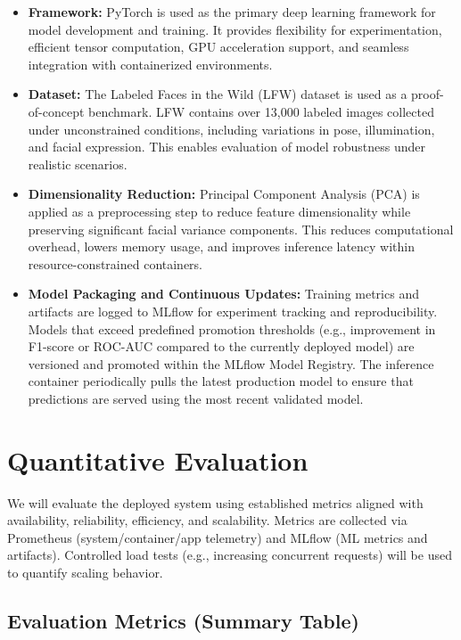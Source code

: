\documentclass[10pt]{article}
\begin{document}
\begin{itemize}[leftmargin=*]

\item \textbf{Framework:}
PyTorch is used as the primary deep learning framework for model development and training. It provides flexibility for experimentation, efficient tensor computation, GPU acceleration support, and seamless integration with containerized environments.

\item \textbf{Dataset:}
The Labeled Faces in the Wild (LFW) dataset is used as a proof-of-concept benchmark. LFW contains over 13,000 labeled images collected under unconstrained conditions, including variations in pose, illumination, and facial expression. This enables evaluation of model robustness under realistic scenarios.

\item \textbf{Dimensionality Reduction:}
Principal Component Analysis (PCA) is applied as a preprocessing step to reduce feature dimensionality while preserving significant facial variance components. This reduces computational overhead, lowers memory usage, and improves inference latency within resource-constrained containers.

\item \textbf{Model Packaging and Continuous Updates:}
Training metrics and artifacts are logged to MLflow for experiment tracking and reproducibility. Models that exceed predefined promotion thresholds (e.g., improvement in F1-score or ROC-AUC compared to the currently deployed model) are versioned and promoted within the MLflow Model Registry. The inference container periodically pulls the latest production model to ensure that predictions are served using the most recent validated model.

\end{itemize}

\section*{Quantitative Evaluation}

We will evaluate the deployed system using established metrics aligned with availability, reliability, efficiency, and scalability. Metrics are collected via Prometheus (system/container/app telemetry) and MLflow (ML metrics and artifacts). Controlled load tests (e.g., increasing concurrent requests) will be used to quantify scaling behavior.

\subsection*{Evaluation Metrics (Summary Table)}
\end{document}
